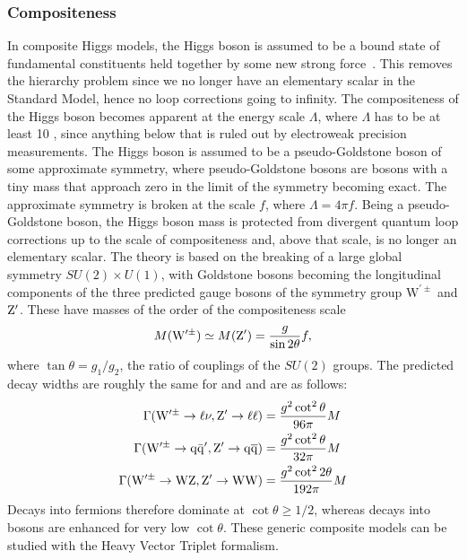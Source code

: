 \subsubsection{Compositeness}
In composite Higgs models, the Higgs boson is assumed to be a bound state of fundamental constituents held together by some new strong force~\cite{Bellazzini:2014yua,Contino:2011np}. This removes the hierarchy problem since we no longer have an elementary scalar in the Standard Model, hence no loop corrections going to infinity. The compositeness of the Higgs boson becomes apparent at the energy scale $\Lambda$, where $\Lambda$ has to be at least 10 \TeV, since anything below that is ruled out by electroweak precision measurements.
The Higgs boson is assumed to be a pseudo-Goldstone boson of some approximate symmetry, where pseudo-Goldstone bosons are bosons with a tiny mass that approach zero in the limit of the symmetry becoming exact. The approximate symmetry is broken at the scale $f$, where $\Lambda=4\pi f$. Being a pseudo-Goldstone boson, the Higgs boson mass is protected from divergent quantum loop corrections up to the scale of compositeness and, above that scale, is no longer an elementary scalar.
The theory is based on the breaking of a large global symmetry $SU(2) \times U(1)$, with Goldstone bosons becoming the longitudinal components of the three predicted gauge bosons of the symmetry group $\mathrm{W}^{\prime\pm}$ and $\mathrm{Z}^\prime$. These have masses of the order of the compositeness scale
\begin{equation}\label{eqn:LHvprimeMass}
M(\mathrm{W}^{\prime\pm}) \simeq M(\mathrm{Z}^\prime) = \frac{g}{\sin2\theta}f,
\end{equation}
\noindent where $\tan\theta = g_1/g_2$, the ratio of couplings of the $SU(2)$ groups. The predicted decay widths are roughly the same for \PZpr and \PWpr and are as follows:
\begin{equation}
\begin{aligned}
\Gamma(\mathrm{W}^{\prime\pm} \to \ell\nu, \mathrm{Z}^\prime \to \ell\ell) & = \frac{g^2\cot^2\theta}{96\pi}M\\
\Gamma(\mathrm{W}^{\prime\pm} \to \mathrm{q}\bar{\mathrm{q}}^\prime,\mathrm{Z}^\prime \to \mathrm{q}\overline{\mathrm{q}}) & = \frac{g^2\cot^2\theta}{32\pi}M\\
\Gamma(\mathrm{W}^{\prime\pm} \to \mathrm{W}\mathrm{Z},\mathrm{Z}^\prime \to \mathrm{W}\mathrm{W}) & = \frac{g^2\cot^22\theta}{192\pi}M
\end{aligned} 
\end{equation}
Decays into fermions therefore dominate at $\cot\theta \geq 1/2$, whereas decays into bosons are enhanced for very low $\cot\theta$.\newline
These generic composite models can be studied with the Heavy Vector Triplet formalism.

